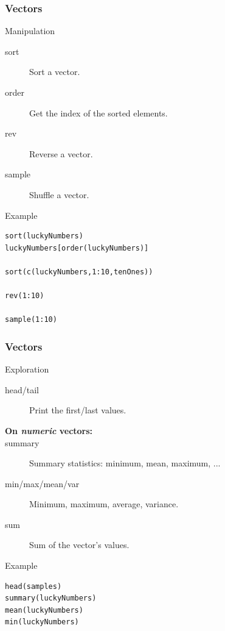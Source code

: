 \documentclass[10pt]{beamer}
\newenvironment{xframe}[2][]
  {\begin{frame}[fragile,environment=xframe,#1]
  \frametitle{#2}}
  {\end{frame}}
\begin{document}
\begin{xframe}[shrink=5]{Vectors}
  \begin{block}{Manipulation}
    \begin{description}
    \item[sort] Sort a {\sf vector}.
    \item[order] Get the index of the sorted elements.
    \item[rev] Reverse a {\sf vector}.
    \item[sample] Shuffle a {\sf vector}.
    \end{description}
  \end{block}
  \begin{exampleblock}{Example}
\begin{verbatim}
sort(luckyNumbers)
luckyNumbers[order(luckyNumbers)]

sort(c(luckyNumbers,1:10,tenOnes))

rev(1:10)

sample(1:10)
\end{verbatim}
  \end{exampleblock}
\end{xframe}


\begin{xframe}{Vectors}
  \begin{block}{Exploration}
    \begin{description}
    \item[head/tail] Print the first/last values.
      \medskip
    \item[{\bf\small On {\it numeric} {\sf vector}s:}]
    \item[summary] Summary statistics: minimum, mean, maximum, ...
    \item[min/max/mean/var] Minimum, maximum, average, variance.
    \item[sum] Sum of the {\sf vector}'s values.
    \end{description}
  \end{block}
  \begin{exampleblock}{Example}
\begin{verbatim}
head(samples)
summary(luckyNumbers)
mean(luckyNumbers)
min(luckyNumbers)
\end{verbatim}
  \end{exampleblock}
\end{xframe}
\end{document}
